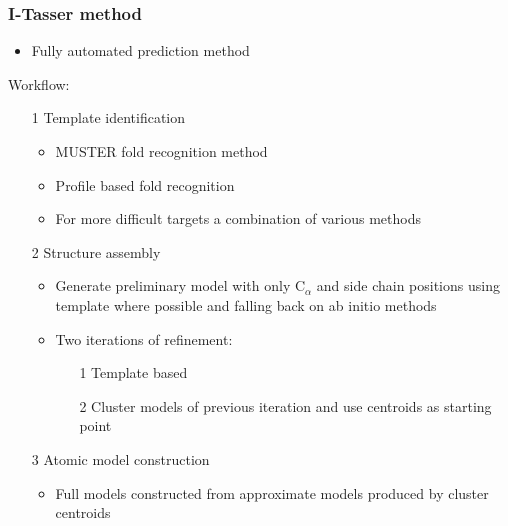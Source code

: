 \documentclass[a4paper]{article}
\begin{document}
\subsubsection{I-Tasser method}

\begin{itemize}
  \item
    Fully automated prediction method
\end{itemize}

Workflow:

\begin{enumerate}
  \item[1]
    Template identification

    \begin{itemize}
      \item
        MUSTER fold recognition method

      \item
        Profile based fold recognition

      \item
        For more difficult targets a combination of various methods
    \end{itemize}

  \item[2]
    Structure assembly

    \begin{itemize}
      \item
        Generate preliminary model with only $\mathrm{C}_{\alpha}$ and side
        chain positions using template where possible and falling back on ab
        initio methods

      \item
        Two iterations of refinement:

        \begin{enumerate}
          \item[1]
            Template based

          \item[2]
            Cluster models of previous iteration and use centroids as starting
            point
        \end{enumerate}
    \end{itemize}

  \item[3]
    Atomic model construction

    \begin{itemize}
      \item
        Full models constructed from approximate models produced by cluster
        centroids


\end{itemize}
\end{enumerate}
\end{document}
